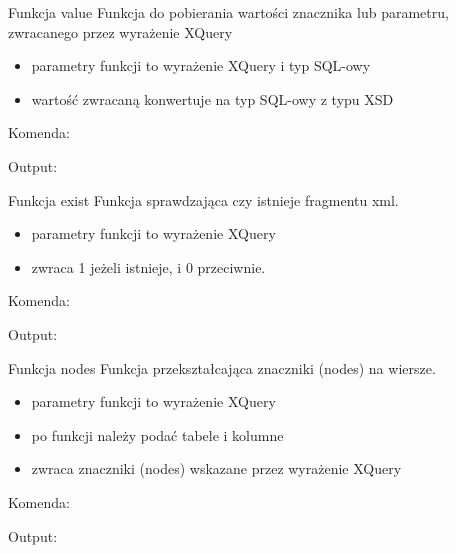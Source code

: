 	\begin{frame}{Funkcja value}
		Funkcja do pobierania wartości znacznika lub parametru, zwracanego przez
		wyrażenie XQuery
		 	
	   	\begin{itemize}
		  \item parametry funkcji to wyrażenie XQuery i typ SQL-owy 
		  \item wartość zwracaną konwertuje na typ SQL-owy z typu XSD 
		\end{itemize}
		
	   	Komenda:
		
		Output:	
			  		
	\end{frame}
	
	\begin{frame}{Funkcja exist}
		Funkcja sprawdzająca czy istnieje fragmentu xml.
		 	
	   	\begin{itemize}
		  \item parametry funkcji to wyrażenie XQuery
		  \item zwraca 1 jeżeli istnieje, i 0 przeciwnie.
		\end{itemize}
		
	   	Komenda:
		
		Output:	
		  		
	\end{frame}
	
	\begin{frame}{Funkcja nodes}
		Funkcja przekształcająca znaczniki (nodes) na wiersze.
		 	
	   	\begin{itemize}
		  \item parametry funkcji to wyrażenie XQuery
		  \item po funkcji należy podać tabele i kolumne
		  \item zwraca znaczniki (nodes) wskazane przez wyrażenie XQuery
		\end{itemize}
		
	   	Komenda:
		
		Output:	
		  		
	\end{frame}

